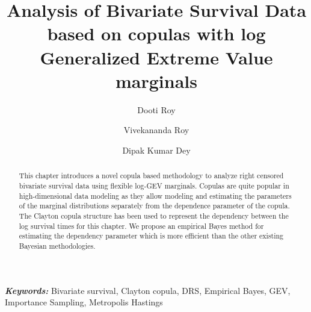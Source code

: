 \documentclass[11pt]{article}
\title{Analysis of Bivariate Survival Data based on copulas with log Generalized Extreme Value marginals}
\author[*]{Dooti Roy}
\author[**]{ Vivekananda Roy}
\author[*]{Dipak Kumar Dey}
\affil[*]{University of Connecticut, Storrs, CT, USA}
\affil[**]{Iowa State University, Ames, Iowa, USA}
\theoremstyle{remboldstyle}
\begin{document}
\providecommand{\keywords}[1]{\textbf{\textit{Keywords: }} #1}
\maketitle
\begin{abstract}
\noindent
This chapter introduces a novel copula based methodology to analyze right censored bivariate survival data using flexible log-GEV marginals. Copulas are quite popular in high-dimensional data modeling as they allow modeling and estimating the parameters of the marginal distributions separately from the dependence parameter of the copula. The Clayton copula structure has been used to represent the dependency between the log survival times for this chapter. We propose an empirical Bayes method for estimating the dependency parameter which is more efficient than the other existing Bayesian methodologies. 
\end{abstract}
\keywords{Bivariate survival, Clayton copula, DRS, Empirical Bayes, GEV, Importance Sampling, Metropolis Hastings}
\end{document}
